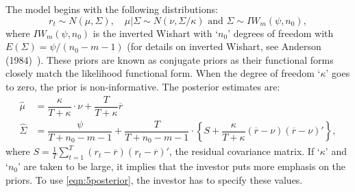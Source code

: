 The model begins with the following distributions:
	\begin{equation} \label{eqn:5distributions}
	r_t \sim N(\mu,\Sigma), \quad \mu \big| \Sigma \sim N(\nu, \Sigma/\kappa) \text{ and } \Sigma \sim I W_m(\psi,n_0),
	\end{equation}
where $I W_m(\psi,n_0)$ is the inverted Wishart with `$n_0$' degrees of freedom with $E(\Sigma)= \psi/(n_0 - m - 1)$ (for details on inverted Wishart, see Anderson (1984)~\cite{andersontw2}). These priors are known as conjugate priors as their functional forms closely match the likelihood functional form. When the degree of freedom `$\kappa$' goes to zero, the prior is non-informative. The posterior estimates are:
	\begin{equation}\label{eqn:5posterior}
	\begin{split}
	\hat{\mu}&= \dfrac{\kappa}{T+\kappa} \cdot \nu + \dfrac{T}{T+\kappa} \overline{r} \\
	\hat{\Sigma}&= \dfrac{\psi}{T+n_0-m-1} + \dfrac{T}{T+n_0-m-1} \cdot \left\{S + \dfrac{\kappa}{T+\kappa} (\overline{r}-\nu)(\overline{r}-\nu)' \right\},
	\end{split}
	\end{equation}
where $S= \frac{1}{T} \sum_{t=1}^T (r_t - \overline{r})(r_t - \overline{r})'$, the residual covariance matrix. If `$\kappa$' and `$n_0$' are taken to be large, it implies that the investor puts more emphasis on the priors. To use \eqref{eqn:5posterior}, the investor has to specify these values. 


